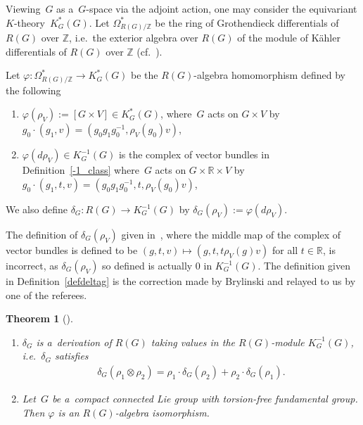 \documentclass[pdftex]{sigma}
\numberwithin{equation}{section}
\newtheorem{Theorem}{Theorem}[section]
\begin{document}
Viewing~$G$ as a~$G$-space via the adjoint action, one may consider the equivariant $K$-theo\-ry~$K_G^*(G)$.
Let $\Omega^*_{R(G)/\mathbb{Z}}$ be the ring of Grothendieck dif\/ferentials of $R(G)$ over $\mathbb{Z}$, i.e.\
the exterior algebra over $R(G)$ of the module of K\"ahler dif\/ferentials of $R(G)$ over $\mathbb{Z}$ (cf.~\cite{BZ}).
\begin{Definition}
\label{defdeltag}
Let $\varphi: \Omega_{R(G)/\mathbb{Z}}^*\to K_G^*(G)$ be the $R(G)$-algebra homomorphism def\/ined by the following
\begin{enumerate}\itemsep=0pt
\item[1)]
$\varphi(\rho_V):=[G\times V]\in K_G^*(G)$, where~$G$ acts on $G\times V$ by $g_0\cdot(g_1, v)=(g_0g_1g_0^{-1},
\rho_V(g_0)v)$,
\item[2)]
$\varphi(d\rho_V)\in K_G^{-1}(G)$ is the complex of vector bundles in Def\/inition~\ref{-1_class} where~$G$ acts on
$G\times \mathbb{R}\times V$ by $g_0\cdot(g_1, t, v)=(g_0g_1g_0^{-1}, t, \rho_V(g_0)v)$,
\end{enumerate}
We also def\/ine $\delta_G: R(G)\to K^{-1}_G (G)$ by $\delta_G(\rho_V):=\varphi(d\rho_V)$.
\end{Definition}
\begin{Remark}
The def\/inition of $\delta_G(\rho_V)$ given in~\cite{BZ}, where the middle map of the complex of vector bundles is
def\/ined to be $(g, t, v)\mapsto(g, t, t\rho_V(g)v)$ for all $t\in\mathbb{R}$, is incorrect, as $\delta_G(\rho_V)$ so
def\/ined is actually 0 in $K_G^{-1}(G)$.
The def\/inition given in Def\/inition~\ref{defdeltag} is the correction made by Brylinski and relayed to us by one of the
referees.
\end{Remark}
\begin{Theorem}[\cite{BZ}]\label{eqderivation}\quad
\begin{enumerate}\itemsep=0pt
\item[$1.$]
$\delta_G$ is a~derivation of $R(G)$ taking values in the $R(G)$-module $K^{-1}_G(G)$, i.e.\
$\delta_G$ satisfies
\begin{gather}
\label{eqleibniz}
\delta_G(\rho_1\otimes\rho_2)=\rho_1\cdot\delta_G(\rho_2)+\rho_2\cdot\delta_G(\rho_1).
\end{gather}
\item[$2.$]
Let~$G$ be a~compact connected Lie group with torsion-free fundamental group.
Then $\varphi$ is an $R(G)$-algebra isomorphism.
\end{enumerate}
\end{Theorem}
\end{document}
